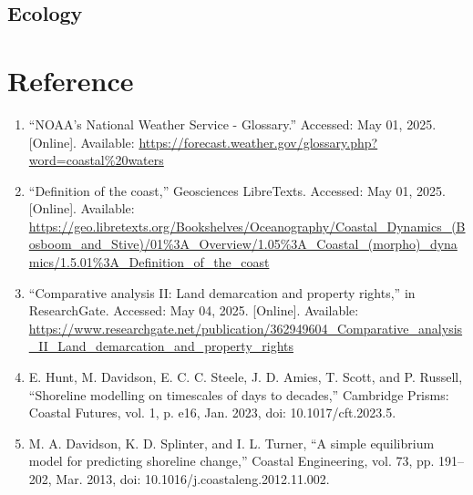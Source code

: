\documentclass{article}
\begin{document}

\subsection{Ecology}




\newpage
{}
\fancyfoot[C]{}
\thispagestyle{fancy}
\section{Reference}

\begin{sloppypar}
\begin{enumerate}

    \item{“NOAA’s National Weather Service - Glossary.” Accessed: May 01, 2025. [Online]. Available: \url{https://forecast.weather.gov/glossary.php?word=coastal\%20waters}}
    
    \item{“Definition of the coast,” Geosciences LibreTexts. Accessed: May 01, 2025. [Online]. Available: \url{https://geo.libretexts.org/Bookshelves/Oceanography/Coastal_Dynamics_(Bosboom_and_Stive)/01%3A_Overview/1.05%3A_Coastal_(morpho)_dynamics/1.5.01%3A_Definition_of_the_coast}}
    
    \item{“Comparative analysis II: Land demarcation and property rights,” in ResearchGate. Accessed: May 04, 2025. [Online]. Available: \url{https://www.researchgate.net/publication/362949604_Comparative_analysis_II_Land_demarcation_and_property_rights}}
    
    \item{E. Hunt, M. Davidson, E. C. C. Steele, J. D. Amies, T. Scott, and P. Russell, “Shoreline modelling on timescales of days to decades,” Cambridge Prisms: Coastal Futures, vol. 1, p. e16, Jan. 2023, doi: 10.1017/cft.2023.5.}

    \item{M. A. Davidson, K. D. Splinter, and I. L. Turner, “A simple equilibrium model for predicting shoreline change,” Coastal Engineering, vol. 73, pp. 191–202, Mar. 2013, doi: 10.1016/j.coastaleng.2012.11.002.}


\end{enumerate}
\end{sloppypar}
\end{document}
